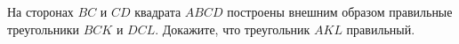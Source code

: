 \begin{ex}
	\begin{condition}
		На сторонах \( BC  \) и \( CD  \) квадрата \( ABCD  \) построены внешним образом правильные треугольники \( BCK  \) и \( DCL \). Докажите, что треугольник \( AKL  \) правильный.
	\end{condition}
\end{ex}